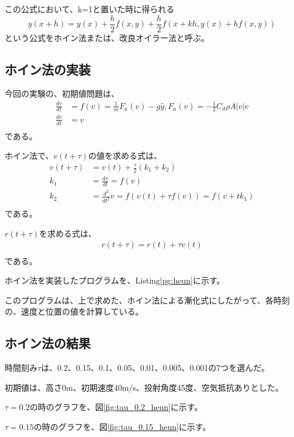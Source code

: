 \documentclass[a4paper, 11pt, titlepage]{jsarticle}
\begin{document}
この公式において、k=1と置いた時に得られる
$$
y(x+h) = y(x) + \frac{h}{2}f(x,y) + \frac{h}{2}f(x+kh, y(x) + hf(x,y))
$$
という公式をホイン法または、改良オイラー法と呼ぶ。

\subsection{ホイン法の実装}
今回の実験の、初期値問題は、
\begin{align*}
	\frac{dv}{dt} &= f(v) = \frac{1}{m}F_a(v) - g\hat{y}, F_a(v) = -\frac{1}{2}C_d\rho A|v|v\\
	\frac{dv}{dt} &= v\\
\end{align*}
である。

ホイン法で、$v(t + \tau)$の値を求める式は、
\begin{align*}
	v(t + \tau) &= v(t) + \frac{\tau}{2}(k_1 + k_2)\\
	k_1 &= \frac{dv}{dt} = f(v)\\
	k_2 &= \frac{d^2}{dt^2}v = f(v(t) + \tau f(v)) = f(v + tk_1)\\
\end{align*}
である。

$r(t + \tau)$を求める式は、
\begin{align*}
	r(t + \tau) = r(t) + \tau v(t)\\
\end{align*}
である。

ホイン法を実装したプログラムを、Listing\ref{pg:heun}に示す。

このプログラムは、上で求めた、ホイン法による漸化式にしたがって、各時刻の、速度と位置の値を計算している。



\subsection{ホイン法の結果}
時間刻み$\tau$は、0.2、0.15、0.1、0.05、0.01、0.005、0.001の7つを選んだ。

初期値は、高さ0m、初期速度40m/s、投射角度45度、空気抵抗ありとした。

$\tau = 0.2$の時のグラフを、図\ref{fig:tau_0.2_heun}に示す。

$\tau = 0.15$の時のグラフを、図\ref{fig:tau_0.15_heun}に示す。
\end{document}
